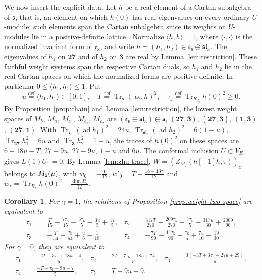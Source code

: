 \documentclass[leqno]{article}
\let\cal\relax
\newcommand{\cal}{\mathcal}
\renewcommand{\leq}{\ensuremath{\leqslant}}
\renewcommand{\geq}{\ensuremath{\geqslant}}
\newcommand{\ov}{\overset}
\newtheorem{cor}[thm]{Corollary}
\numberwithin{equation}{section}
\begin{document}
We now insert the explicit data. Let $h$ be a real element of a Cartan subalgebra of $\mathfrak s$, that is, an element on which $h(0)$ has real eigenvalues on every ordinary $U$-module; such elements span the Cartan subalgebra since its weights on $U$-modules lie in a positive-definite lattice \cite[Theorem 1 p.~3]{Mas14}. Normalize $\langle h,h\rangle = 1$, where $\langle\cdot,\cdot\rangle$ is the normalized invariant form of $\mathfrak e_8$, and write $h = (h_1,h_2) \in \mathfrak e_6 \oplus \mathfrak{sl}_3$. The eigenvalues of $h_1$ on $\mathbf{27}$ and of $h_2$ on $\mathbf3$ are real by Lemma \ref{lem:restriction}. These faithful weight systems span the respective Cartan duals, so $h_1$ and $h_2$ lie in the real Cartan spaces on which the normalized forms are positive definite. In particular $0 \leq \langle h_1,h_1\rangle \leq 1$. Put
\[
u \ov{\mathrm{def}}{=} \langle h_1,h_1\rangle \in [0,1],\quad T \ov{\mathrm{def}}{=} \operatorname{Tr}_{\mathfrak s}(\operatorname{ad}h)^2,\quad \tau_j \ov{\mathrm{def}}{=} \operatorname{Tr}_{R_{d_j}}h(0)^2 \geq 0.
\]
By Proposition \ref{prop:chain} and Lemma \ref{lem:restriction}, the lowest weight spaces of $M_b$, $M_a$, $M_{c_0}$, $M_{c_1}$, $M_{c_2}$ are $(\mathfrak e_6 \oplus \mathfrak{sl}_3) \ominus \mathfrak s$, $(\mathbf{27},\mathbf 3)$, $(\mathbf{27},\overline{\mathbf 3})$, $(\mathbf 1,\mathbf 3)$, $(\mathbf{27},\mathbf 1)$. With $\operatorname{Tr}_{\mathfrak e_6}(\operatorname{ad}h_1)^2 = 24u$, $\operatorname{Tr}_{\mathfrak{sl}_3}(\operatorname{ad}h_2)^2 = 6(1-u)$, $\operatorname{Tr}_{\mathbf{27}}h_1^2 = 6u$ and $\operatorname{Tr}_{\mathbf 3}h_2^2 = 1-u$, the traces of $h(0)^2$ on these spaces are $6+18u-T$, $27-9u$, $27-9u$, $1-u$ and $6u$. The conformal inclusion $U \subset V_{E_8}$ gives $L(1)U_1 = 0$. By Lemma \ref{lem:zhu-trace}, $W = (Z_{M_z}(h[-1]h,\tau))_z$ belongs to $\cal M_2(\mu)$, with $w_0 = -\frac{1}{12}$, $w'_0 = T+\frac{18-13\gamma}{12}$ and $w_z = \operatorname{Tr}_{R_z}h(0)^2-\frac{\dim R_z}{12}$.

\begin{cor}
\label{cor:tau-formulas}
For $\gamma = 1$, the relations of Proposition \ref{prop:weight-two-space} are equivalent to
\begin{align*}
\tau_1 & = \tfrac{T}{15}-\tfrac{7\tau_5}{15}-\tfrac{3\tau_6}{5}-\tfrac{3u}{5}+\tfrac{17}{5}, & \tau_2 & = \tfrac{317T}{270}-\tfrac{209\tau_5}{270}-\tfrac{7\tau_6}{5}-\tfrac{317u}{30}+\tfrac{2009}{90},\\
\tau_3 & = -\tfrac{T}{54}+\tfrac{\tau_5}{54}+\tfrac{u}{6}-\tfrac{1}{18}, & \tau_4 & = -\tfrac{7T}{90}-\tfrac{11\tau_5}{90}+\tfrac{\tau_6}{5}+\tfrac{7u}{10}-\tfrac{19}{30}.
\end{align*}
For $\gamma = 0$, they are equivalent to
\begin{align*}
\tau_1 & = \tfrac{-2T-3\tau_6+18u-4}{5}, & \tau_2 & = \tfrac{2T-7\tau_6-18u+74}{5}, & \tau_3 & = \tfrac{3(-3T+3\tau_6+27u+29)}{5},\\
\tau_4 & = \tfrac{-T+\tau_6+9u-7}{5}, & \tau_5 & = T-9u+9.
\end{align*}
\end{cor}
\end{document}
